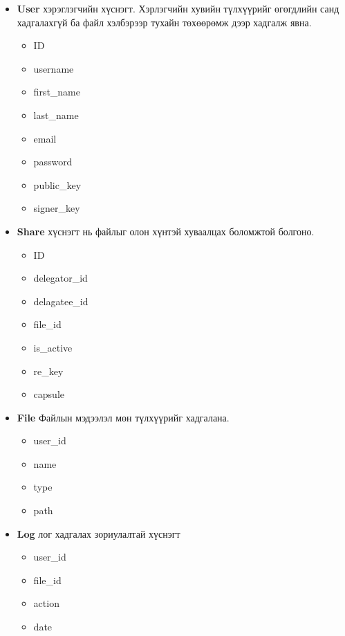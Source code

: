 \begin{itemize}
    \item \textbf{User} хэрэглэгчийн хүснэгт. Хэрлэгчийн хувийн түлхүүрийг өгөгдлийн санд хадгалахгүй ба файл хэлбэрээр тухайн төхөөрөмж дээр хадгалж явна.
          \begin{itemize}
              \item ID
              \item username
              \item first\_name
              \item last\_name
              \item email
              \item password
              \item public\_key
              \item signer\_key
          \end{itemize}
    \item \textbf{Share} хүснэгт нь файлыг олон хүнтэй хуваалцах боломжтой болгоно.
          \begin{itemize}
              \item ID
              \item delegator\_id
              \item delagatee\_id
              \item file\_id
              \item is\_active
              \item re\_key
              \item capsule
          \end{itemize}
    \item \textbf{File} Файлын мэдээлэл мөн түлхүүрийг хадгалана.
          \begin{itemize}
              \item user\_id
              \item name
              \item type
              \item path
          \end{itemize}
    \item \textbf{Log} лог хадгалах зориулалтай хүснэгт
          \begin{itemize}
              \item user\_id
              \item file\_id
              \item action
              \item date
          \end{itemize}
\end{itemize}


